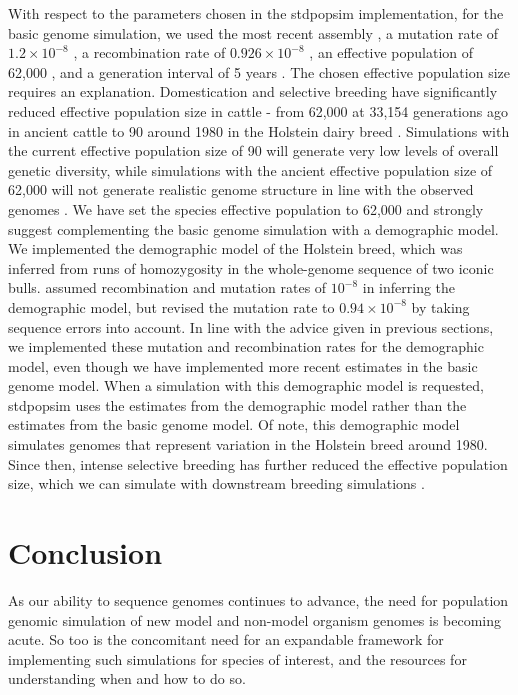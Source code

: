 \documentclass[hidelinks]{article}
\begin{document}
With respect to the parameters chosen in the stdpopsim implementation,
for the basic genome simulation, we used the most recent assembly
\citep{Rosen2020}, a mutation rate of \(1.2 \times 10^{-8}\) \citep{Harland2017},
a recombination rate of \(0.926 \times 10^{-8}\) \citep{Ma2015}, an
effective population of 62,000 \citep{MacLeod2013}, and a generation interval of 5
years \citep{MacLeod2013}. The chosen effective population size requires
an explanation. Domestication and selective breeding have significantly reduced
effective population size in cattle - from 62,000 at 33,154 generations ago in
ancient cattle to 90 around 1980 in the Holstein dairy breed \citep{MacLeod2013}.
Simulations with the current effective population size of 90 will generate very
low levels of overall genetic diversity, while simulations with the ancient
effective population size of 62,000 will not generate realistic genome structure
in line with the observed genomes \citep[e.g.,][]{Rosen2020}. We have set
the species effective population to 62,000 and strongly suggest complementing the
basic genome simulation with a demographic model. We implemented
the \cite{MacLeod2013} demographic model of the Holstein breed, which was
inferred from runs of homozygosity in the whole-genome sequence of two
iconic bulls. \cite{MacLeod2013} assumed
recombination and mutation rates of \(10^{-8}\) in inferring the
demographic model, but revised the mutation rate to \(0.94 \times 10^{-8}\) by
taking sequence errors into account. In line with the advice given in
previous sections, we implemented these mutation and recombination rates
for the \cite{MacLeod2013} demographic model, even though we have implemented
more recent estimates in the basic genome model. When a simulation with this
demographic model is requested, stdpopsim uses the estimates from the
demographic model rather than the estimates from the basic genome model.
Of note, this demographic model simulates genomes that represent variation
in the Holstein breed around 1980. Since then, intense selective breeding has
further reduced the effective population size, which we can simulate with
downstream breeding simulations \citep[e.g.,][]{MacLeod2014, Gaynor2020, Obsteter2021}. 

\hypertarget{conclusion}{%
\section*{Conclusion}\label{conclusion}}

As our ability to sequence genomes continues to advance, the need for
population genomic simulation of new model and non-model organism genomes is
becoming acute. So too is the concomitant need for an expandable framework
for implementing such simulations for species of interest, and
the resources for understanding when and how to do so.
\end{document}
